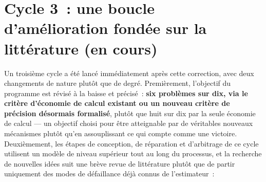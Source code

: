 \documentclass[11pt,a4paper]{article}
\begin{document}
\section{Cycle 3~: une boucle d'amélioration fondée sur la littérature (en cours)}
\label{sec:cycle3}

Un troisième cycle a été lancé immédiatement après cette correction, avec
deux changements de nature plutôt que de degré. Premièrement, l'objectif
du programme est révisé à la baisse et précisé~: \textbf{six problèmes sur
dix, via le critère d'économie de calcul existant ou un nouveau critère de
précision désormais formalisé}, plutôt que huit sur dix par la seule
économie de calcul --- un objectif choisi pour être atteignable par de
véritables nouveaux mécanismes plutôt qu'en assouplissant ce qui compte
comme une victoire. Deuxièmement, les étapes de conception, de réparation
et d'arbitrage de ce cycle utilisent un modèle de niveau supérieur tout au
long du processus, et la recherche de nouvelles idées suit une brève revue
de littérature plutôt que de partir uniquement des modes de défaillance déjà
connus de l'estimateur~:
\end{document}
